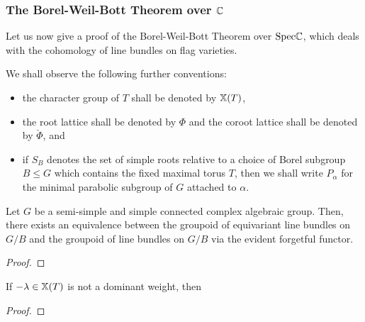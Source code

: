             \subsubsection{The Borel-Weil-Bott Theorem over \texorpdfstring{$\mathbb{C}$}{}}
                Let us now give a proof of the Borel-Weil-Bott Theorem over $\mathrm{Spec} \mathbb{C}$, which deals with the cohomology of line bundles on flag varieties. 
                
                \begin{convention}
                    We shall observe the following further conventions:
                        \begin{itemize}
                            \item the character group of $T$ shall be denoted by $\mathbb{X}(T)$,
                            \item the root lattice shall be denoted by $\Phi$ and the coroot lattice shall be denoted by $\check{\Phi}$, and
                            \item if $S_B$ denotes the set of simple roots relative to a choice of Borel subgroup $B \leq G$ which contains the fixed maximal torus $T$, then we shall write $P_{\alpha}$ for the minimal parabolic subgroup of $G$ attached to $\alpha$.
                        \end{itemize}
                \end{convention}
                
                \begin{proposition}
                    Let $G$ be a semi-simple and simple connected complex algebraic group. Then, there exists an equivalence between the groupoid of equivariant line bundles on $G/B$ and the groupoid of line bundles on $G/B$ via the evident forgetful functor. 
                \end{proposition}
                    \begin{proof}
                            
                    \end{proof}
                    
                \begin{lemma}
                    If $-\lambda \in \mathbb{X}(T)$ is not a dominant weight, then 
                \end{lemma}
                    \begin{proof}
                        
                    \end{proof}
        
